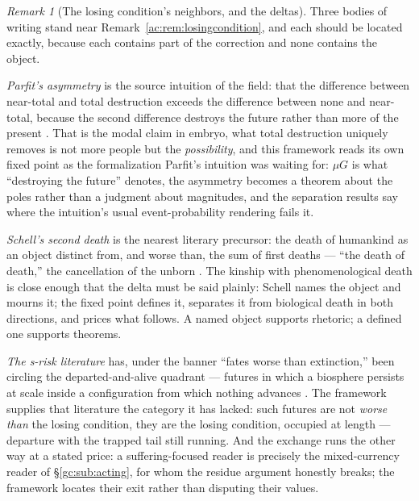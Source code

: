 \documentclass[11pt]{article}
\numberwithin{equation}{section}
\theoremstyle{plain}
\theoremstyle{definition}
\theoremstyle{remark}
\newtheorem{remark}[theorem]{Remark}
\begin{document}
\begin{remark}[The losing condition's neighbors, and the deltas]
\label{ac:rem:losingneighbors}
Three bodies of writing stand near Remark~\ref{ac:rem:losingcondition},
and each should be located exactly, because each contains part of the
correction and none contains the object.

\emph{Parfit's asymmetry} is the source intuition of the field: that
the difference between near-total and total destruction exceeds the
difference between none and near-total, because the second difference
destroys the future rather than more of the present \cite{Parfit84}.
That is the modal claim in embryo, what total destruction uniquely
removes is not more people but the \emph{possibility}, and this
framework reads its own fixed point as the formalization Parfit's
intuition was waiting for: $\mu G$ is what ``destroying the future''
denotes, the asymmetry becomes a theorem about the poles rather than a
judgment about magnitudes, and the separation results say where the
intuition's usual event-probability rendering fails it.

\emph{Schell's second death} is the nearest literary precursor: the
death of humankind as an object distinct from, and worse than, the sum
of first deaths --- ``the death of death,'' the cancellation of the
unborn \cite{Schell82}. The kinship with phenomenological death is
close enough that the delta must be said plainly: Schell names the
object and mourns it; the fixed point defines it, separates it from
biological death in both directions, and prices what follows. A named
object supports rhetoric; a defined one supports theorems.

\emph{The s-risk literature} has, under the banner ``fates worse than
extinction,'' been circling the departed-and-alive quadrant --- futures
in which a biosphere persists at scale inside a configuration from
which nothing advances \cite{AG16}. The framework supplies that
literature the category it has lacked: such futures are not
\emph{worse than} the losing condition, they are the losing condition,
occupied at length --- departure with the trapped tail still running.
And the exchange runs the other way at a stated price: a
suffering-focused reader is precisely the mixed-currency reader of
\S\ref{gc:sub:acting}, for whom the residue argument honestly breaks;
the framework locates their exit rather than disputing their values.
\end{remark}
\end{document}
